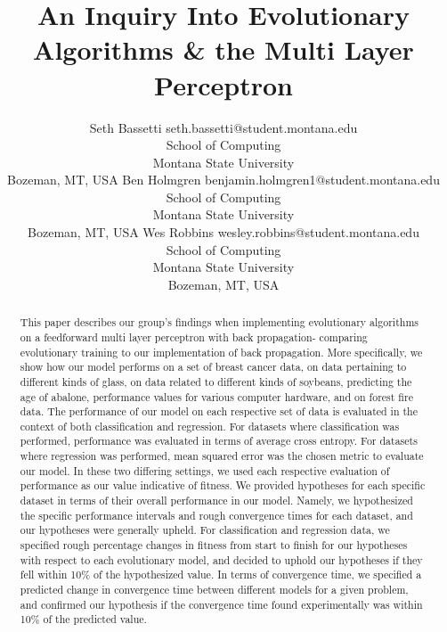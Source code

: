 \documentclass[twoside,11pt]{article}
\begin{document}
\title{An Inquiry Into Evolutionary Algorithms \& the Multi Layer Perceptron}

\author{\name Seth Bassetti \email seth.bassetti@student.montana.edu \\
       \addr School of Computing\\
       Montana State University\\
       Bozeman, MT, USA
	\AND
	\name Ben Holmgren \email benjamin.holmgren1@student.montana.edu \\
       \addr School of Computing\\
       Montana State University\\
       Bozeman, MT, USA
       \AND
       \name Wes Robbins \email wesley.robbins@student.montana.edu \\
       \addr School of Computing\\
       Montana State University\\
       Bozeman, MT, USA}

\maketitle

\begin{abstract}%
This paper describes our group's findings when implementing evolutionary algorithms on a feedforward multi layer
perceptron with back propagation-  comparing evolutionary training to our implementation of back propagation. 
 More specifically, we show how our model performs on a set of breast cancer data, on data pertaining
to different kinds of glass, on data related to different kinds of soybeans, predicting the age of abalone,
performance values for various computer hardware, and on forest fire data.
	The performance of our model on each respective set of data
 is evaluated in the context of both classification and regression. For datasets where
 classification was performed, performance was evaluated in terms of average cross entropy. 
	For datasets where regression was performed,
 mean squared error was the chosen metric to evaluate
 our model. In these two differing settings, we used each respective evaluation of performance as our value indicative of fitness.
	We provided hypotheses for each specific dataset in terms of their overall performance in our model.
 Namely, we hypothesized the specific performance intervals and rough convergence times for each dataset, and our
 hypotheses were generally upheld. For classification and regression data, we specified rough percentage changes in fitness from start to finish
	for
our hypotheses with respect to each evolutionary model, and decided to uphold our hypotheses if they fell within 10\% of the hypothesized
value. In terms of convergence time, we specified a predicted change in convergence time between different models 
	for a given problem, and confirmed our hypothesis
if the convergence time found experimentally was within 10\% of the predicted value.
\end{abstract}
\end{document}
